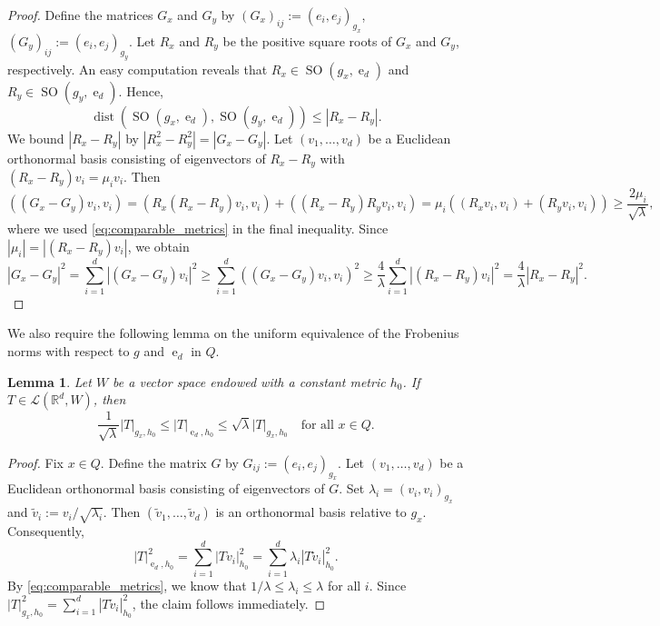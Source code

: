 \documentclass{article}
\numberwithin{equation}{section}
\newtheorem{lemma}[theorem]{Lemma}
\theoremstyle{definition}
\theoremstyle{remark}
\DeclareMathOperator{\dist}{dist}
\DeclareMathOperator{\e}{e}
\DeclareMathOperator{\SO}{SO}
\begin{document}
\begin{proof}
    Define the matrices $G_x$ and $G_y$ by $(G_x)_{ij} := (e_i, e_j)_{g_x}$, $(G_y)_{ij} := (e_i, e_j)_{g_y}$. Let $R_x$ and $R_y$ be the positive square roots of $G_x$ and $G_y$, respectively. An easy computation reveals that $R_x \in \SO(g_x, \e_d)$ and $R_y \in \SO(g_y, \e_d)$. Hence,
    \[
    \dist(\SO(g_x, \e_d), \SO(g_y, \e_d)) \le |R_x - R_y|.
    \]
    We bound $|R_x - R_y|$ by $|R_x^2 - R_y^2| = |G_x - G_y|$. Let $(v_1, \dots, v_d)$ be a Euclidean orthonormal basis consisting of eigenvectors of $R_x - R_y$ with $(R_x - R_y)v_i = \mu_i v_i$. Then
    \[
    ((G_x - G_y)v_i, v_i) = (R_x(R_x - R_y)v_i, v_i) + ((R_x - R_y)R_yv_i, v_i) = \mu_i\left((R_xv_i, v_i) + (R_yv_i, v_i)\right) \ge \frac{2\mu_i}{\sqrt{\lambda}},
    \]
    where we used \eqref{eq:comparable_metrics} in the final inequality. Since $|\mu_i| = |(R_x - R_y)v_i|$, we obtain
    \[
    |G_x - G_y|^2 = \sum_{i = 1}^d |(G_x - G_y)v_i|^2 \ge \sum_{i = 1}^d ((G_x - G_y)v_i, v_i)^2 \ge \frac{4}{\lambda} \sum_{i = 1}^d |(R_x - R_y)v_i|^2 = \frac{4}{\lambda} |R_x - R_y|^2.
    \]
\end{proof}

We also require the following lemma on the uniform equivalence of the Frobenius norms with respect to $g$ and $\e_d$ in $Q$.

\begin{lemma} \label{lm:frobenius_norm_comparison}
    Let $W$ be a vector space endowed with a constant metric $h_0$. If $T \in \mathcal{L}(\mathbb{R}^d, W)$, then
    \begin{equation} \label{eq:frobenius_norm_comparison}
         \frac{1}{\sqrt{\lambda}} |T|_{g_x, h_0} \le |T|_{\e_d, h_0} \le \sqrt{\lambda} |T|_{g_x, h_0} \quad \text{for all } x \in Q.
    \end{equation}
\end{lemma}

\begin{proof}
    Fix $x \in Q$. Define the matrix $G$ by $G_{ij} := (e_i, e_j)_{g_x}$. Let $(v_1, \dots, v_d)$ be a Euclidean orthonormal basis consisting of eigenvectors of $G$. Set $\lambda_i = (v_i, v_i)_{g_x}$ and $\tilde{v}_i := v_i/\sqrt{\lambda_i}$. Then $(\tilde{v}_1, \dots, \tilde{v}_d)$ is an orthonormal basis relative to $g_x$. Consequently,
    \[
    |T|_{\e_d, h_0}^2 = \sum_{i = 1}^d |Tv_i|_{h_0}^2 = \sum_{i = 1}^d \lambda_i |T \tilde{v}_i|_{h_0}^2.
    \]
    By \eqref{eq:comparable_metrics}, we know that $1/\lambda \le \lambda_i \le \lambda$ for all $i$. Since $|T|_{g_x, h_0}^2 = \sum_{i = 1}^d |T\tilde{v}_i|_{h_0}^2$, the claim follows immediately.
\end{proof}
\end{document}
